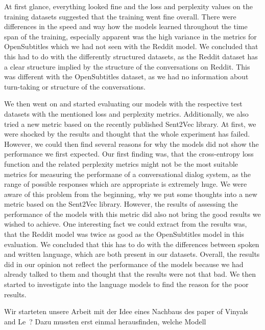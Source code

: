 At first glance, everything looked fine and the loss and perplexity values on the training datasets suggested that the training went fine overall. There were differences in the speed and way how the models learned throughout the time span of the training, especially apparent was the high variance in the metrics for OpenSubtitles which we had not seen with the Reddit model. We concluded that this had to do with the differently structured datasets, as the Reddit dataset has a clear structure implied by the structure of the conversations on Reddit. This was different with the OpenSubtitles dataset, as we had no information about turn-taking or structure of the conversations.

We then went on and started evaluating our models with the respective test datasets with the mentioned loss and perplexity metrics. Additionally, we also tried a new metric based on the recently published Sent2Vec library. At first, we were shocked by the results and thought that the whole experiment has failed. However, we could then find several reasons for why the models did not show the performance we first expected. Our first finding was, that the cross-entropy loss function and the related perplexity metrics might not be the most suitable metrics for measuring the performane of a conversational dialog system, as the range of possible responses which are appropriate is extremely huge. We were aware of this problem from the beginning, why we put some thoughts into a new metric based on the Sent2Vec library. However, the results of assessing the performance of the models with this metric did also not bring the good results we wished to achieve. One interesting fact we could extract from the results was, that the Reddit model was twice as good as the OpenSubtitles model in this evaluation. We concluded that this has to do with the differences between spoken and written language, which are both present in our datasets. Overall, the results did in our opinion not reflect the performance of the models because we had already talked to them and thought that the results were not that bad. We then started to investigate into the language models to find the reason for the poor results.





Wir starteten unsere Arbeit mit der Idee eines Nachbaus des paper of Vinyals and Le~\cite{Vinyals:2015}? Dazu mussten erst einmal herausfinden, welche Modell 

